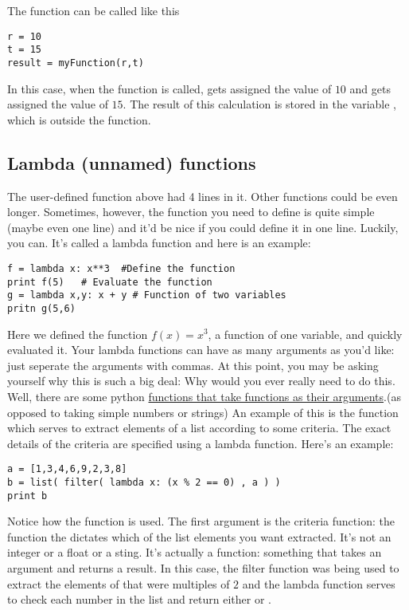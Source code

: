 The function can be called like this
\begin{Verbatim}
r = 10
t = 15
result = myFunction(r,t)
\end{Verbatim}
In this case, when the function is called,  gets assigned
the value of $10$ and  gets assigned the value of $15$.  The
result of this calculation is stored in the variable ,
which is outside the function.
\subsection*{Lambda (unnamed) functions}
The user-defined function above had 4 lines in it.  Other functions
could be even longer.  Sometimes, however, the function you need to
define is quite simple (maybe even one line) and it'd be nice if you
could define it in one line.  Luckily, you can.  It's
called a lambda function and here is an example:
\begin{Verbatim}
f = lambda x: x**3  #Define the function
print f(5)   # Evaluate the function
g = lambda x,y: x + y # Function of two variables
pritn g(5,6)
\end{Verbatim}
Here we defined the function $f(x) = x^3$, a function of one variable,
and quickly evaluated it.  Your lambda functions can have as many
arguments as you'd like: just seperate the arguments with commas.  At
this point, you may be asking yourself why this is such a big deal:
Why would you ever really need to do this.  Well, there are some
python \underline{functions that take functions as their
  arguments}.(as opposed
to taking simple numbers or strings) An example of this is the
 function which serves to extract elements of a list
according to some criteria.  The exact details of the criteria are
specified using a lambda function.  Here's an example:
\begin{Verbatim}
a = [1,3,4,6,9,2,3,8]
b = list( filter( lambda x: (x % 2 == 0) , a ) )
print b
\end{Verbatim}
Notice how the  function is used.  The first argument
is the criteria function: the function the dictates which of the list
elements you want extracted. It's not an integer or a float or a
sting.  It's actually a function: something that takes an argument and
returns a result.  In this case, the filter function was being used to
extract the elements of  that were multiples of $2$ and the
lambda function serves to check each number in the list and return
either  or .

